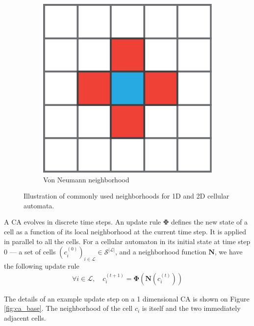 \begin{figure}[htbp]
\begin{subfigure}[c]{.3\linewidth}
    \includegraphics[width=\linewidth]{figures/von_neumann}
    \caption{Von Neumann neighborhood}
    \label{fig:von_neumann}
  \end{subfigure}

  \caption{Illustration of commonly used neighborhoods for 1D and 2D cellular automata.}
  \label{fig:neighborhoods}
\end{figure}

A \ac{CA} evolves in discrete time steps. An update rule $\boldsymbol{\Phi}$
defines the new state of a cell as a function of its local neighborhood at the
current time step. It is applied in parallel to all the cells. For a cellular
automaton in its initial state at time step 0 --- \ie a set of cells
$\left(c_{i}^{(0)}\right)_{i \in \mathcal{L}} \in \mathcal{S}^{|\mathcal{L}|}$, and a neighborhood function
$\boldsymbol{N}$, we have the following update rule
\begin{equation}
\begin{aligned}
\forall i \in \mathcal{L}, \quad c_{i}^{(t + 1)} = \boldsymbol{\Phi}\left(\boldsymbol{N}\left(c_{i}^{(t)}\right)\right)
\end{aligned}
\end{equation}

The details of an example update step on a 1 dimensional \ac{CA} is shown on
Figure \ref{fig:ca_base}. The neighborhood of the cell $c_{i}$ is itself and the
two immediately adjacent cells.

